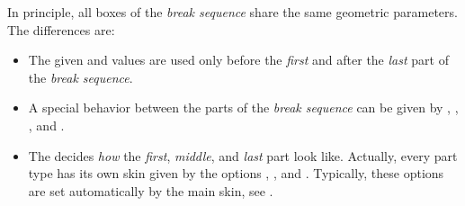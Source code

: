 \clearpage
In principle, all boxes of the \emph{break sequence} share the same geometric
parameters. The differences are:
\begin{itemize}
\item The given  and  values are
  used only before the \emph{first} and after the \emph{last} part
  of the \emph{break sequence}.
\item A special behavior between the parts of the \emph{break sequence} can
  be given by ,
  ,
  , and
  .
\item The  decides \emph{how} the \emph{first}, \emph{middle},
  and \emph{last} part look like. Actually, every part type has its own
  skin given by the options  , , and
  . Typically, these options are set automatically by
  the main skin, see .
\end{itemize}


